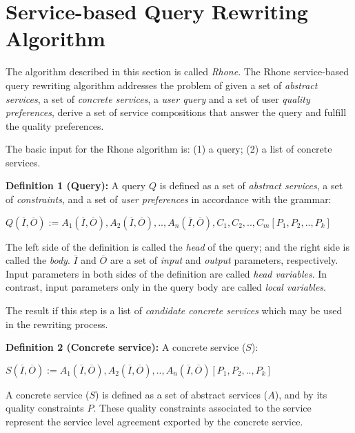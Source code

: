 \section{Service-based Query Rewriting Algorithm}
\label{sec:rhone} 
The algorithm described in this section is called \textit{Rhone}. 
The Rhone service-based query rewriting algorithm addresses the problem of given
a set of \textit{abstract services}, a set of \textit{concrete services}, a
\textit{user query} and a set of user \textit{quality preferences}, derive a set
of service compositions that answer the query and fulfill the quality preferences.

The basic input for the Rhone algorithm is: (1) a query; (2) a list of concrete services.

\bigskip
\noindent \textbf{Definition 1 (Query):} 
A query $Q$ is defined as a set of \textit{abstract services}, a set of \textit{constraints}, and a set of \textit{user preferences} in accordance with the grammar: 
\begin{center}
$Q (\overline{I}, \overline{O}) := A_{1}(\overline{I}, \overline{O}), A_{2}(\overline{I}, \overline{O}), ..,  A_{n}(\overline{I}, \overline{O}),C_{1},C_{2}, .., C_{m}[P_{1},P_{2}, .., P_{k}]$
\end{center}  

The left side of the definition is called the \textit{head} of the query; and the right side is called the \textit{body}. 
$\overline{I}$ and $\overline{O}$ are a set of \textit{input} and \textit{output} parameters, respectively.
Input parameters in both sides of the definition are called \textit{head variables}.
In contrast, input parameters only in the query body are called \textit{local variables}.

The result if this step is a list of \textit{candidate concrete services} which
 may be used in the rewriting process.

\bigskip
\noindent \textbf{Definition 2 (Concrete service):} A concrete service ($S$):
\begin{center}
$S (\overline{I}, \overline{O}) := A_{1}(\overline{I}, \overline{O}), A_{2}(\overline{I}, \overline{O}), ..,  A_{n}(\overline{I}, \overline{O})[P_{1},P_{2}, .., P_{k}]$
\end{center}  

A concrete service ($S$) is defined as a set of abstract services ($A$), and by its quality constraints $P$. 
These quality constraints associated to the service represent the service level agreement exported by the concrete service.


